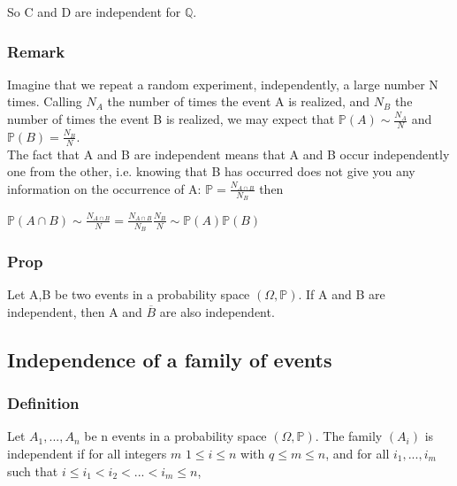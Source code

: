                 \vspace{5pt}
                
                \noindent So C and D are independent for $\mathbb{Q}$.

            \subsubsection{Remark}
                Imagine that we repeat a random experiment, independently, a large number N times. Calling $N_A$ the number of times the event A is realized, and $N_B$ the number of times the event B is realized, we may expect that $\mathbb{P}(A)\sim\frac{N_A}{N}$ and $\mathbb{P}(B)=\frac{N_B}{N}$. \\
                \newpage
                The fact that A and B are independent means that A and B occur independently one from the other, i.e. knowing that B has occurred does not give you any information on the occurrence of A: $\mathbb{P}=\frac{N_{A\cap B}}{N_B}$ then

                \vspace{5pt}

                \centerline{$\mathbb{P}(A\cap B)\sim\frac{N_{A\cap B}}{N}=\frac{N_{A\cap B}}{N_B}\frac{N_B}{N}\sim\mathbb{P}(A)\mathbb{P}(B)$}

            \subsubsection{Prop}
                Let A,B be two events in a probability space $(\Omega, \mathbb{P})$. If A and B are independent, then A and $\overline{B}$  are also independent.

        \subsection{Independence of a family of events}
            \subsubsection{Definition}
            Let $A_1,...,A_n$ be n events in a probability space $(\Omega, \mathbb{P})$. The family $(A_i)$ is independent if for all integers $m$ $1\leq i \leq n$ with $q \leq m \leq n$, and for all $i_1,...,i_m$ such that $i \leq i_1 < i_2 < ... <i_m \leq n$,

            \vspace{5pt}
            
